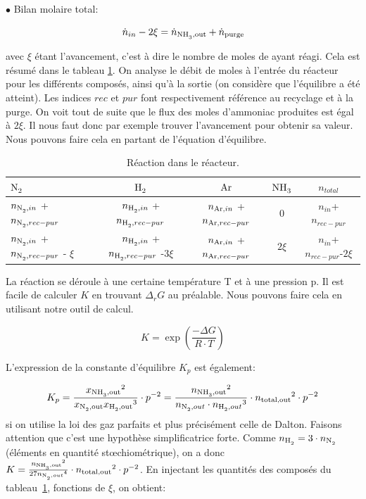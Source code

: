 $\bullet$ Bilan molaire total:

\begin{equation}
	\dot{n}_{in} - 2\xi=\dot{n}_{\ce{NH3},\text{out}} + \dot{n}_{\text{purge}}
	\label{eq:bilan_mol_tot}
\end{equation}

avec $\xi$ étant l'avancement, c'est à dire le nombre de moles de  ayant réagi. 
Cela est résumé dans le tableau \ref{tab:reaction_purge_eq}.
On analyse le débit de moles à l'entrée du réacteur pour les différents composés, 
ainsi qu'à la sortie (on considère que l'équilibre a été atteint). 
Les indices $rec$ et $pur$ font respectivement référence au recyclage et à la purge. 
On voit tout de suite que le flux des moles d'ammoniac produites est égal à $2 \xi$. Il
nous faut donc par exemple trouver l'avancement pour obtenir sa valeur. Nous pouvons faire
cela en partant de l'équation d'équilibre.

\begin{table}[h!]
	\centering
	\begin{tabular}{l|c|c|c|c}
		$\ce{N2}$ & $\ce{H2}$ & $\ce{Ar}$ & $\ce{NH3}$ & $n_{total}$ \\
		\hline
		$n_{\ce{N2},in}$ + $n_{\ce{N2},rec-pur}$ & $n_{\ce{H2},in}$ +$n_{\ce{H2},rec-pur}$ & $n_{\ce{Ar},in}$ + $n_{\ce{Ar},rec-pur}$ & $0$  & $n_{in}$+$n_{rec-pur}$\\
		$n_{\ce{N2},in}$ + $n_{\ce{N2},rec-pur}$ - $\xi$ & $n_{\ce{H2},in}$ +$n_{\ce{H2},rec-pur}$ -$3 \xi$ & $n_{\ce{Ar},in}$ + $n_{\ce{Ar},rec-pur}$ & $2 \xi$  & $n_{in}$+$n_{rec-pur}$-$2 \xi$\\
	\end{tabular}
	\caption{Réaction dans le réacteur.}
	\label{tab:reaction_purge_eq}
\end{table}

La réaction se déroule à une certaine température T et à une pression p. 
Il est facile de calculer $K$ en trouvant $\Delta_r G$ au préalable. 
Nous pouvons faire cela en utilisant notre outil de calcul.

\[
K=\exp{\left(\frac{-\Delta G}{R \cdot T}\right)}\]

L'expression de la constante d'équilibre $K_p$ est également: 

\[
K_p=\frac{{x_{\ce{NH3},\text{out}}}^2}{x_{\ce{N2},\text{out}}{x_{\ce{H2},\text{out}}}^3} \cdot p^{-2} = 
\frac{{n_{\ce{NH3},\text{out}}}^2}{n_{\ce{N2},out}\cdot {n_{\ce{H2},out}}^3}\cdot {n_{\text{total,out}}}^2\cdot p^{-2}
\]
si on utilise la loi des gaz parfaits et plus précisément celle de Dalton. Faisons attention que c'est une hypothèse simplificatrice forte. 
Comme $n_{\ce{H2}}=3\cdot n_{\ce{N2}}$ (éléments en quantité stœchiométrique), 
on a donc 
$K=\frac{{n_{\ce{NH3},\text{out}}}^2}{27{n_{\ce{N2},out}}^4} \cdot
{n_{\text{total,out}}}^2\cdot p^{-2}$. 
En injectant les quantités des composés du tableau~\ref{tab:reaction_purge_eq},
fonctions de $\xi$, on obtient:

